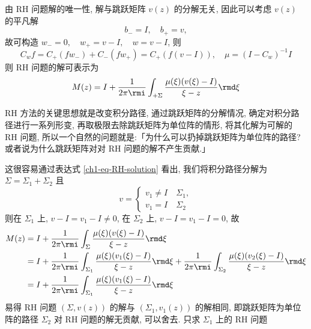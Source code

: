 \begin{remark}
    由 RH 问题解的唯一性, 解与跳跃矩阵 $ v(z) $ 的分解无关, 因此可以考虑 $ v(z) $ 的平凡解
    \begin{equation}
        b_{-} = I, \quad b_{+} = v,
    \end{equation}
    故可构造 $w_{-} = 0, \quad w_{+} = v - I, \quad w = v - I$, 则
    \begin{equation}
        C_{w}f =  C_{+}(fw_{-}) + C_{-}(fw_{+}) = C_{+}(f(v - I)), \quad \mu = (I - C_{w})^{-1}I
    \end{equation}
    则 RH 问题的解可表示为
    \begin{equation}
        M(z) = I + \frac{1}{2 \pi \rmi} \int_{+\Sigma} \frac{\mu(\xi) (v(\xi) - I)}{\xi - z}  \rmd \xi \label{ch1-eq-RH-solution}
    \end{equation}
\end{remark}

RH 方法的关键思想就是改变积分路径, 通过跳跃矩阵的分解情况, 确定对积分路径进行一系列形变, 再取极限去除跳跃矩阵为单位阵的情形, 将其化解为可解的 RH 问题, 所以一个自然的问题就是:「为什么可以扔掉跳跃矩阵为单位阵的路径? 或者说为什么跳跃矩阵对对 RH 问题的解不产生贡献.」

这很容易通过表达式 \eqref{ch1-eq-RH-solution} 看出, 我们将积分路径分解为 $ \Sigma = \Sigma_{1} + \Sigma_{2} $ 且
\begin{equation}
    v = \begin{cases}
        v_1 \neq I \quad \Sigma_{1}, \\
        v_1 = I \quad \Sigma_{2}
    \end{cases}
\end{equation}
则在 $ \Sigma_{1} $ 上, $ v- I = v_{1} - I \neq 0 $, 在 $ \Sigma_{2} $ 上, $ v- I = v_{1} - I = 0 $, 故
\begin{equation}
    \begin{aligned}
        M(z) & = I + \frac{1}{2 \pi \rmi} \int_{\Sigma} \frac{\mu(\xi) (v(\xi) - I)}{\xi - z}  \rmd \xi                                                                                                      \\
             & = I + \frac{1}{2 \pi \rmi} \int_{\Sigma_{1}} \frac{\mu(\xi) (v_{1}(\xi) - I)}{\xi - z}  \rmd \xi + \frac{1}{2 \pi \rmi} \int_{\Sigma_{2}} \frac{\mu(\xi) (v_{2}(\xi) - I)}{\xi - z}  \rmd \xi \\
             & = I + \frac{1}{2 \pi \rmi} \int_{\Sigma_1} \frac{\mu(\xi) (v_{1}(\xi) - I)}{\xi - z}  \rmd \xi
    \end{aligned}
\end{equation}
易得 RH 问题 $ (\Sigma, v(z)) $ 的解与 $ (\Sigma_{1}, v_{1}(z)) $ 的解相同, 即跳跃矩阵为单位阵的路径 $ \Sigma_{2} $ 对 RH 问题的解无贡献, 可以舍去. 只求 $ \Sigma_{1} $ 上的 RH 问题

